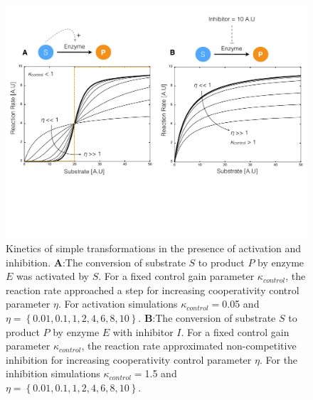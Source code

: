 \documentclass[12pt]{article}
\begin{document}
\begin{figure}
\centering
\includegraphics[width=1.0\textwidth]{./figs/Figure-3-EnzymeKinetics.pdf}
\caption{Kinetics of simple transformations in the presence of activation and inhibition. 
\textbf{A}:The conversion of substrate $S$ to product $P$ by enzyme $E$ was activated by $S$. 
For a fixed control gain parameter $\kappa_{control}$, the reaction rate approached a step for increasing cooperativity control parameter $\eta$. 
For activation simulations $\kappa_{control}=$0.05 and $\eta=\left\{0.01,0.1,1,2,4,6,8,10\right\}$.
\textbf{B}:The conversion of substrate $S$ to product $P$ by enzyme $E$ with inhibitor $I$. 
For a fixed control gain parameter $\kappa_{control}$, the reaction rate approximated non-competitive inhibition for increasing cooperativity control parameter $\eta$. 
For the inhibition simulations $\kappa_{control}=$1.5 and $\eta=\left\{0.01,0.1,1,2,4,6,8,10\right\}$.}\label{fig-kinetics-simulations}
\end{figure}

\clearpage
\end{document}
